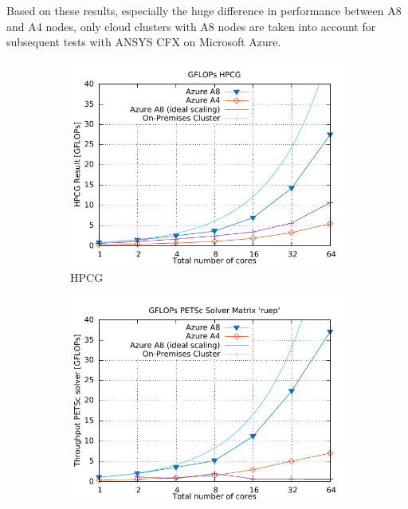 \documentclass[3p,times]{elsarticle}
\begin{document}
Based on these results, especially the huge difference in performance between A8 and A4 nodes, only cloud clusters with A8 nodes are taken into account for subsequent tests with ANSYS CFX on Microsoft Azure.





\begin{figure}[h]
\centering
\begin{subfigure}{.33\textwidth}
	\centering
	\includegraphics[width=\linewidth]{gplt-gflops-hpcg}
	\caption{HPCG}

	\label{fig:hpcg}
\end{subfigure}
\begin{subfigure}{.33\textwidth}
  \centering
	\includegraphics[width=\linewidth]{gplt-gflops-ruep}  


\end{subfigure}
\end{figure}
\end{document}
